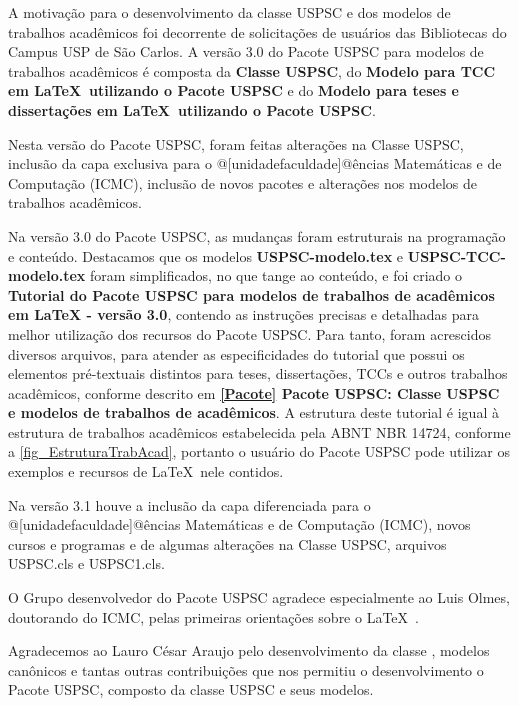 \begin{agradecimentos}
	A motiva\c{c}\~ao para o desenvolvimento da classe USPSC e dos modelos de trabalhos acad\^emicos foi decorrente de solicita\c{c}\~oes de usu\'arios das Bibliotecas do Campus USP de S\~ao Carlos. A vers\~ao 3.0 do Pacote USPSC para modelos de trabalhos acad\^emicos \'e composta da \textbf{Classe USPSC}, do \textbf{Modelo para TCC em \LaTeX\ utilizando o Pacote USPSC} e do \textbf{Modelo para teses e disserta\c{c}\~oes em \LaTeX\ utilizando o Pacote USPSC}.
	
	Nesta vers\~ao do Pacote USPSC, foram feitas altera\c{c}\~oes na Classe USPSC, inclus\~ao da capa exclusiva para o @[unidadefaculdade]@\^encias Matem\'aticas e de Computa\c{c}\~ao (ICMC), inclus\~ao de novos pacotes e altera\c{c}\~oes nos modelos de trabalhos acad\^emicos.
	
	Na vers\~ao 3.0 do Pacote USPSC, as mudan\c{c}as foram estruturais na programa\c{c}\~ao e conte\'udo. Destacamos que os modelos \textbf{USPSC-modelo.tex} e \textbf{USPSC-TCC-modelo.tex} foram simplificados, no que tange ao conte\'udo, e foi criado o \textbf{Tutorial do Pacote USPSC para modelos de trabalhos de acad\^emicos em LaTeX - vers\~ao 3.0}, contendo as instru\c{c}\~oes precisas e detalhadas para melhor utiliza\c{c}\~ao dos recursos do Pacote USPSC. Para tanto, foram acrescidos diversos arquivos, para atender as especificidades do tutorial que possui os elementos pr\'e-textuais distintos para teses, disserta\c{c}\~oes, TCCs e outros trabalhos acad\^emicos, conforme descrito em  \textbf{\ref{Pacote} Pacote USPSC: Classe USPSC e modelos de trabalhos de acad\^emicos}. A estrutura deste tutorial \'e igual \`a  estrutura de trabalhos acad\^emicos estabelecida pela ABNT NBR 14724, conforme a \autoref{fig_EstruturaTrabAcad}, portanto o usu\'ario do Pacote USPSC pode utilizar os exemplos e recursos de \LaTeX\ nele contidos.	
	 
	Na vers\~ao 3.1 houve a inclus\~ao da capa diferenciada para o @[unidadefaculdade]@\^encias Matem\'aticas e de Computa\c{c}\~ao (ICMC), novos cursos e programas e de algumas altera\c{c}\~oes na Classe USPSC, arquivos USPSC.cls e  USPSC1.cls.
	
	O Grupo desenvolvedor do Pacote USPSC agradece especialmente ao Luis Olmes, doutorando do ICMC, pelas primeiras orienta\c{c}\~oes sobre o \LaTeX\ . 
	
	Agradecemos ao Lauro C\'esar Araujo pelo desenvolvimento da classe  \abnTeX, modelos can\^onicos e tantas outras contribui\c{c}\~oes que nos permitiu o desenvolvimento o Pacote USPSC, composto da classe USPSC e seus modelos.
	

\end{agradecimentos}
